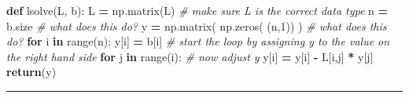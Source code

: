 \documentclass[
]{book}
\newenvironment{Shaded}{\begin{snugshade}}{\end{snugshade}}
\newcommand{\BuiltInTok}[1]{#1}
\newcommand{\CommentTok}[1]{\textcolor[rgb]{0.56,0.35,0.01}{\textit{#1}}}
\newcommand{\ControlFlowTok}[1]{\textcolor[rgb]{0.13,0.29,0.53}{\textbf{#1}}}
\newcommand{\DecValTok}[1]{\textcolor[rgb]{0.00,0.00,0.81}{#1}}
\newcommand{\KeywordTok}[1]{\textcolor[rgb]{0.13,0.29,0.53}{\textbf{#1}}}
\newcommand{\NormalTok}[1]{#1}
\newcommand{\OperatorTok}[1]{\textcolor[rgb]{0.81,0.36,0.00}{\textbf{#1}}}
\theoremstyle{definition}
\theoremstyle{definition}
\theoremstyle{definition}
\theoremstyle{remark}
\begin{document}
\begin{Shaded}
\begin{Highlighting}[]
\KeywordTok{def}\NormalTok{ lsolve(L, b):}
\NormalTok{    L }\OperatorTok{=}\NormalTok{ np.matrix(L) }\CommentTok{\# make sure L is the correct data type}
\NormalTok{    n }\OperatorTok{=}\NormalTok{ b.size }\CommentTok{\# what does this do?}
\NormalTok{    y }\OperatorTok{=}\NormalTok{ np.matrix( np.zeros( (n,}\DecValTok{1}\NormalTok{)) ) }\CommentTok{\# what does this do?}
    \ControlFlowTok{for}\NormalTok{ i }\KeywordTok{in} \BuiltInTok{range}\NormalTok{(n):}
\NormalTok{        y[i] }\OperatorTok{=}\NormalTok{ b[i] }\CommentTok{\# start the loop by assigning y to the value on the right hand side}
        \ControlFlowTok{for}\NormalTok{ j }\KeywordTok{in} \BuiltInTok{range}\NormalTok{(i): }\CommentTok{\# now adjust y }
\NormalTok{            y[i] }\OperatorTok{=}\NormalTok{ y[i] }\OperatorTok{{-}}\NormalTok{ L[i,j] }\OperatorTok{*}\NormalTok{ y[j]}
    \ControlFlowTok{return}\NormalTok{(y)}
\end{Highlighting}
\end{Shaded}

\begin{center}\rule{0.5\linewidth}{0.5pt}\end{center}
\end{document}
